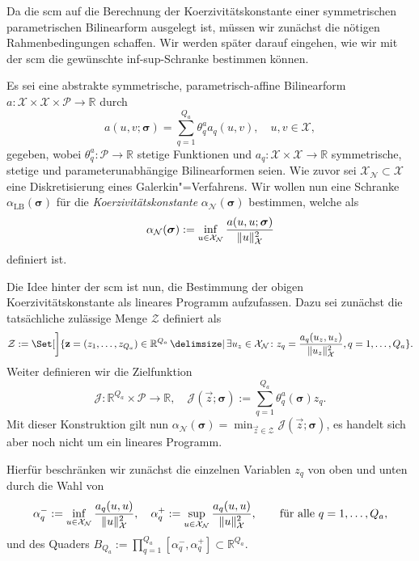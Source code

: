 \documentclass[../main.tex]{subfiles}
\begin{document}
Da die \ac{scm} auf die Berechnung der Koerzivitätskonstante einer symmetrischen parametrischen Bilinearform ausgelegt ist, müssen wir zunächst die nötigen Rahmenbedingungen schaffen.
Wir werden später darauf eingehen, wie wir mit der \ac{scm} die gewünschte inf-sup-Schranke bestimmen können.

Es sei eine abstrakte symmetrische, parametrisch-affine Bilinearform $a \colon \mathcal X \times \mathcal X \times \mathcal P \to \mathbb{R}$ durch
\begin{equation}
    a(u, v; \bm \sigma) = \sum_{q = 1}^{Q_a} \theta_{q}^{a} a_{q}(u, v), \quad u,v \in \mathcal X,
\end{equation}
gegeben, wobei $\theta_{q}^{a} \colon \mathcal P \to \mathbb{R}$ stetige Funktionen und $a_{q} \colon \mathcal X \times \mathcal X \to \mathbb{R}$ symmetrische, stetige und parameterunabhängige Bilinearformen seien.
Wie zuvor sei $\mathcal X_{\mathcal N} \subset \mathcal X$ eine Diskretisierung eines Galerkin"=Verfahrens.
Wir wollen nun eine Schranke $\alpha_{\mathrm{LB}}(\bm \sigma)$ für die \emph{Koerzivitätskonstante} $\alpha_{\mathcal N}(\bm \sigma)$ bestimmen, welche als
\begin{equation}
    \alpha_{\mathcal N}(\bm \sigma) := \inf_{u \in \mathcal X_{\mathcal N}} \frac{a(u, u; \bm \sigma)}{\norm{u}_{\mathcal X}^{2}}
\end{equation}
definiert ist.

Die Idee hinter der \ac{scm} ist nun, die Bestimmung der obigen Koerzivitätskonstante als lineares Programm aufzufassen.
Dazu sei zunächst die tatsächliche zulässige Menge $\mathcal Z$ definiert als
\begin{equation}
    \mathcal Z := \Set[\bigg]{ \vec{z} = (z_{1}, \dots, z_{Q_a}) \in \mathbb{R}^{Q_a} \given \exists u_{z} \in \mathcal X_{\mathcal N} \colon z_{q} = \frac{a_{q}(u_{z}, u_{z})}{\norm{u_{z}}_{\mathcal X}^{2}}, q = 1, \dots, Q_a}.
\end{equation}
Weiter definieren wir die Zielfunktion
\begin{equation}
    \mathcal J \colon \mathbb{R}^{Q_a} \times \mathcal P \to \mathbb{R}, \quad \mathcal J(\vec{z} ;\bm \sigma) := \sum_{q = 1}^{Q_a} \theta_{q}^{a}(\bm \sigma) z_{q}.
\end{equation}
Mit dieser Konstruktion gilt nun $\alpha_{\mathcal N}(\bm \sigma) = \min_{\vec{z} \in \mathcal Z} \mathcal J(\vec{z}; \bm \sigma)$, es handelt sich aber noch nicht um ein lineares Programm.

Hierfür beschränken wir zunächst die einzelnen Variablen $z_{q}$ von oben und unten durch die Wahl von
\begin{equation}
    \alpha_{q}^{-} := \inf_{u \in \mathcal X_{\mathcal{N}}} \frac{a_{q}(u, u)}{\norm{u}^{2}_{\mathcal X}},
    \quad
    \alpha_{q}^{+} := \sup_{u \in \mathcal X_{\mathcal{N}}} \frac{a_{q}(u, u)}{\norm{u}^{2}_{\mathcal X}},
    \qquad \fa q = 1, \dots, Q_a,
\end{equation}
und des Quaders $B_{Q_a} := \prod_{q = 1}^{Q_a} [\alpha^{-}_{q}, \alpha^{+}_{q}] \subset \mathbb{R}^{Q_a}$.
\end{document}
